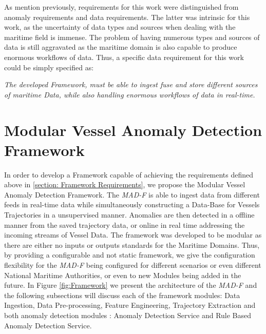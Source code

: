 As mention previously, requirements for this work were distinguished from anomaly requirements and data requirements. The latter was intrinsic for this work, as the uncertainty of data types and sources when dealing with the maritime field is immense. The problem of having numerous types and sources of data is still aggravated as the maritime domain is also capable to produce enormous workflows of data. Thus, a specific data requirement for this work could be simply specified as: 

\emph{The developed Framework, must be able to ingest fuse and store different sources of maritime Data, while also handling enormous workflows of data in real-time.}

\section{Modular Vessel Anomaly Detection Framework}
In order to develop a Framework capable of achieving the requirements defined above in \ref{section: Framework Requirements}, we propose the Modular Vessel Anomaly Detection Framework. The \emph{MAD-F} is able to ingest data from different feeds in real-time data while simultaneously constructing a Data-Base for Vessels Trajectories in a unsupervised manner. Anomalies are then detected in a offline manner from the saved trajectory data, or online in real time addressing the incoming streams of Vessel Data. 
The framework was developed to be modular as there are either no inputs or outputs standards for the Maritime Domains. Thus, by providing a configurable and not static framework, we give the configuration flexibility for the \emph{MAD-F} being configured for different scenarios or even different National Maritime Authorities, or even to new Modules being added in the future.
In Figure \ref{fig:Framework} we present the architecture of the \emph{MAD-F} and the following subsections will discuss each of the framework modules: Data Ingestion, Data Pre-processing, Feature Engineering, Trajectory Extraction and both anomaly detection modules : Anomaly Detection Service and Rule Based Anomaly Detection Service.
